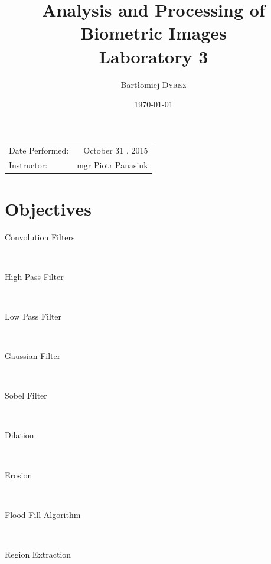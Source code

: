 \documentclass{article}
\title{Analysis and Processing of Biometric Images \\ Laboratory 3} %
\author{Bartłomiej \textsc{Dybisz}} %
\date{\today} %
\begin{document}
\maketitle %

\begin{center}
\begin{tabular}{l r}
Date Performed: & October 31 , 2015 \\ %
Instructor: & mgr Piotr Panasiuk %
\end{tabular}
\end{center}



\section{Objectives}

\begin{description}
\item[Convolution Filters] \hfill \\
\item[High Pass Filter] \hfill \\
\item[Low Pass Filter] \hfill \\
\item[Gaussian Filter] \hfill \\
\item[Sobel Filter] \hfill \\
\item[Dilation] \hfill \\
\item[Erosion] \hfill \\
\item[Flood Fill Algorithm] \hfill \\
\item[Region Extraction] \hfill \\
\end{description}
\end{document}

